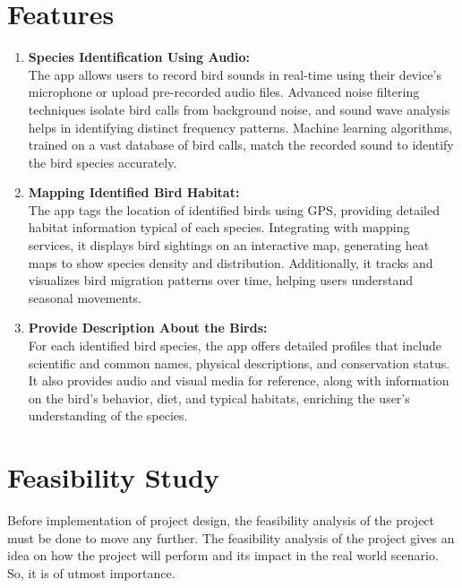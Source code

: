 \section{Features}
\begin{enumerate}
    \item \textbf{Species Identification Using Audio:}\\
          The app allows users to record bird sounds in real-time using their
          device's microphone or
          upload pre-recorded audio files. Advanced noise filtering techniques
          isolate bird calls from
          background noise, and sound wave analysis helps in identifying
          distinct frequency patterns.
          Machine learning algorithms, trained on a vast database of bird
          calls, match the recorded
          sound to identify the bird species accurately.

    \item \textbf{Mapping Identified Bird Habitat:}\\
          The app tags the location of identified birds using GPS, providing
          detailed habitat information
          typical of each species. Integrating with mapping services, it
          displays bird sightings on an
          interactive map, generating heat maps to show species density and
          distribution. Additionally,
          it tracks and visualizes bird migration patterns over time, helping
          users understand seasonal
          movements.

    \item \textbf{Provide Description About the Birds:}\\
          For each identified bird species, the app offers detailed profiles
          that include scientific and
          common names, physical descriptions, and conservation status. It also
          provides audio and visual
          media for reference, along with information on the bird's behavior,
          diet, and typical habitats,
          enriching the user's understanding of the species.

\end{enumerate}
\section{Feasibility Study}
Before implementation of project design, the feasibility analysis of the
project must be done to move any further. The feasibility analysis of the
project gives an idea on how the project will perform and its impact in the
real world scenario. So, it is of utmost importance.
